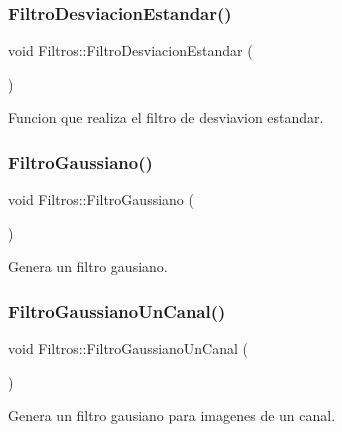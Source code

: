 \subsubsection{\texorpdfstring{Filtro\+Desviacion\+Estandar()}{FiltroDesviacionEstandar()}}
{\footnotesize\ttfamily void Filtros\+::\+Filtro\+Desviacion\+Estandar (\begin{DoxyParamCaption}{ }\end{DoxyParamCaption})}



Funcion que realiza el filtro de desviavion estandar. 

\mbox{\label{class_filtros_a176534ec297bdde49cb959602eea0d29}} 
\subsubsection{\texorpdfstring{Filtro\+Gaussiano()}{FiltroGaussiano()}}
{\footnotesize\ttfamily void Filtros\+::\+Filtro\+Gaussiano (\begin{DoxyParamCaption}{ }\end{DoxyParamCaption})}



Genera un filtro gausiano. 

\mbox{\label{class_filtros_a63c1da79fb2190ae07b354ee4ee67819}} 
\subsubsection{\texorpdfstring{Filtro\+Gaussiano\+Un\+Canal()}{FiltroGaussianoUnCanal()}}
{\footnotesize\ttfamily void Filtros\+::\+Filtro\+Gaussiano\+Un\+Canal (\begin{DoxyParamCaption}{ }\end{DoxyParamCaption})}



Genera un filtro gausiano para imagenes de un canal. 

\mbox{\label{class_filtros_a729e3fca9fd6ab3d39c3ae579ab26737}} 
